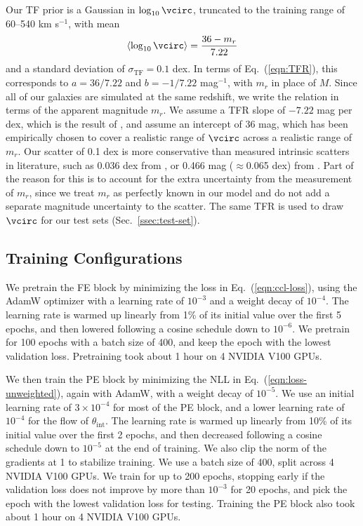 Our TF prior is a Gaussian in $\log_{10}\vcirc$, truncated to the training range of 60--540 km s$^{-1}$, with mean
\begin{equation}
\label{eqn:tf-mean}
    \langle\log_{10}\vcirc\rangle = \frac{36 - m_r}{7.22}
\end{equation}
and a standard deviation of $\sigma_\mathrm{TF}=0.1$ dex. In terms of Eq.~(\ref{eqn:TFR}), this corresponds to $a = 36/7.22$ and $b = -1/7.22$ mag$^{-1}$, with $m_r$ in place of $M$. Since all of our galaxies are simulated at the same redshift, we write the relation in terms of the apparent magnitude $m_r$. We assume a TFR slope of $-7.22$ mag per dex, which is the result of \citep{DESIPVTF2025}, and assume an intercept of 36 mag, which has been empirically chosen to cover a realistic range of $\vcirc$ across a realistic range of $m_r$. Our scatter of 0.1 dex is more conservative than measured intrinsic scatters in literature, such as 0.036 dex from \citep{Reyes11}, or 0.466 mag ($\approx$0.065 dex) from \citep{DESIPVTF2025}. Part of the reason for this is to account for the extra uncertainty from the measurement of $m_r$, since we treat $m_r$ as perfectly known in our model and do not add a separate magnitude uncertainty to the scatter.  The same TFR is used to draw $\vcirc$ for our test sets (Sec.~\ref{ssec:test-set}).

\subsection{Training Configurations}
\label{ssec:train-conf}
We pretrain the FE block by minimizing the loss in Eq.~(\ref{eqn:ccl-loss}), using the AdamW optimizer \citep{AdamW} with a learning rate of $10^{-3}$ and a weight decay of $10^{-4}$. The learning rate is warmed up linearly from 1\% of its initial value over the first 5 epochs, and then lowered following a cosine schedule down to $10^{-6}$. We pretrain for 100 epochs with a batch size of 400, and keep the epoch with the lowest validation loss. Pretraining took about 1 hour on 4 NVIDIA V100 GPUs.

We then train the PE block by minimizing the NLL in Eq.~(\ref{eqn:loss-unweighted}), again with AdamW, with a weight decay of $10^{-5}$. We use an initial learning rate of $3\times10^{-4}$ for most of the PE block, and a lower learning rate of $10^{-4}$ for the flow of $\theta_\mathrm{int}$. The learning rate is warmed up linearly from 10\% of its initial value over the first 2 epochs, and then decreased following a cosine schedule down to $10^{-5}$ at the end of training. We also clip the norm of the gradients at 1 to stabilize training. We use a batch size of 400, split across 4 NVIDIA V100 GPUs. We train for up to 200 epochs, stopping early if the validation loss does not improve by more than $10^{-3}$ for 20 epochs, and pick the epoch with the lowest validation loss for testing. Training the PE block also took about 1 hour on 4 NVIDIA V100 GPUs. 

